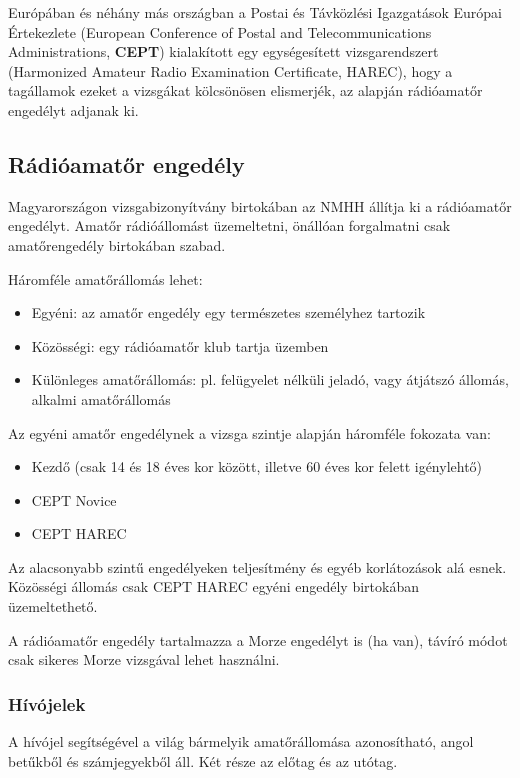 \documentclass[12pt,a4paper]{article}
\begin{document}
Európában és néhány más országban a Postai és Távközlési Igazgatások Európai Értekezlete (European Conference of Postal and Telecommunications Administrations, \textbf{CEPT}) kialakított egy egységesített vizsgarendszert (Harmonized Amateur Radio Examination Certificate, HAREC), hogy a tagállamok ezeket a vizsgákat kölcsönösen elismerjék, az alapján rádióamatőr engedélyt adjanak ki. 
\subsection{Rádióamatőr engedély}
Magyarországon vizsgabizonyítvány birtokában az NMHH állítja ki a rádióamatőr engedélyt. Amatőr rádióállomást üzemeltetni, önállóan forgalmatni csak amatőrengedély birtokában szabad.

Háromféle amatőrállomás lehet:

\begin{itemize}
\item Egyéni: az amatőr engedély egy természetes személyhez tartozik
\item Közösségi: egy rádióamatőr klub tartja üzemben
\item Különleges amatőrállomás: pl. felügyelet nélküli jeladó, vagy átjátszó állomás, alkalmi amatőrállomás
\end{itemize} 

Az egyéni amatőr engedélynek a vizsga szintje alapján háromféle fokozata van: 

\begin{itemize}
\item Kezdő (csak 14 és 18 éves kor között, illetve 60 éves kor felett igénylehtő)
\item CEPT Novice
\item CEPT HAREC
\end{itemize} 
Az alacsonyabb szintű engedélyeken teljesítmény és egyéb korlátozások alá esnek. Közösségi állomás csak CEPT HAREC egyéni engedély birtokában üzemeltethető.

A rádióamatőr engedély tartalmazza a Morze engedélyt is (ha van), távíró módot csak sikeres Morze vizsgával lehet használni.

\subsubsection{Hívójelek}

A hívójel segítségével a világ bármelyik amatőrállomása azonosítható, angol betűkből és számjegyekből áll. Két része az előtag és az utótag.
\end{document}
